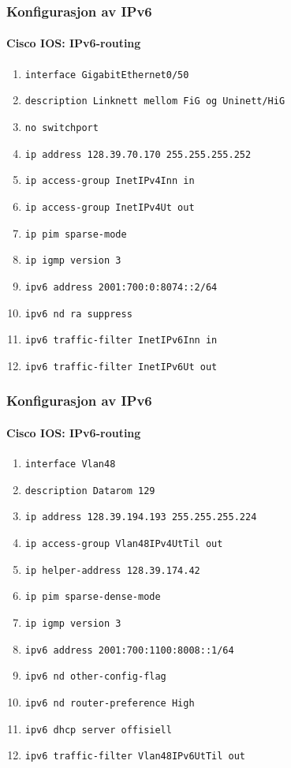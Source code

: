 \begin{frame}%
  \frametitle{Konfigurasjon av IPv6}
  \framesubtitle{Cisco IOS: IPv6-routing}
  \begin{enumerate}[<+->]
  \item \alert{\texttt{interface GigabitEthernet0/50}}
  \item \texttt{description Linknett mellom FiG og Uninett/HiG}
  \item \alert{\texttt{no switchport}}
  \item \texttt{ip address 128.39.70.170 255.255.255.252}
  \item \texttt{ip access-group InetIPv4Inn in}
  \item \texttt{ip access-group InetIPv4Ut out}
  \item \texttt{ip pim sparse-mode}
  \item \texttt{ip igmp version 3}
  \item \alert{\texttt{ipv6 address 2001:700:0:8074::2/64}}
  \item \alert{\texttt{ipv6 nd ra suppress}}
  \item \alert{\texttt{ipv6 traffic-filter InetIPv6Inn in}}
  \item \alert{\texttt{ipv6 traffic-filter InetIPv6Ut out}}
  \end{enumerate}
\end{frame}

\begin{frame}%
  \frametitle{Konfigurasjon av IPv6}
  \framesubtitle{Cisco IOS: IPv6-routing}
  \begin{enumerate}[<+->]
  \item \alert{\texttt{interface Vlan48}}
  \item \texttt{description Datarom 129}
  \item \texttt{ip address 128.39.194.193 255.255.255.224}
  \item \texttt{ip access-group Vlan48IPv4UtTil out}
  \item \texttt{ip helper-address 128.39.174.42}
  \item \texttt{ip pim sparse-dense-mode}
  \item \texttt{ip igmp version 3}
  \item \alert{\texttt{ipv6 address 2001:700:1100:8008::1/64}}
  \item \alert{\texttt{ipv6 nd other-config-flag}}
  \item \alert{\texttt{ipv6 nd router-preference High}}
  \item \alert{\texttt{ipv6 dhcp server offisiell}}
  \item \alert{\texttt{ipv6 traffic-filter Vlan48IPv6UtTil out}}
  \end{enumerate}
\end{frame}

